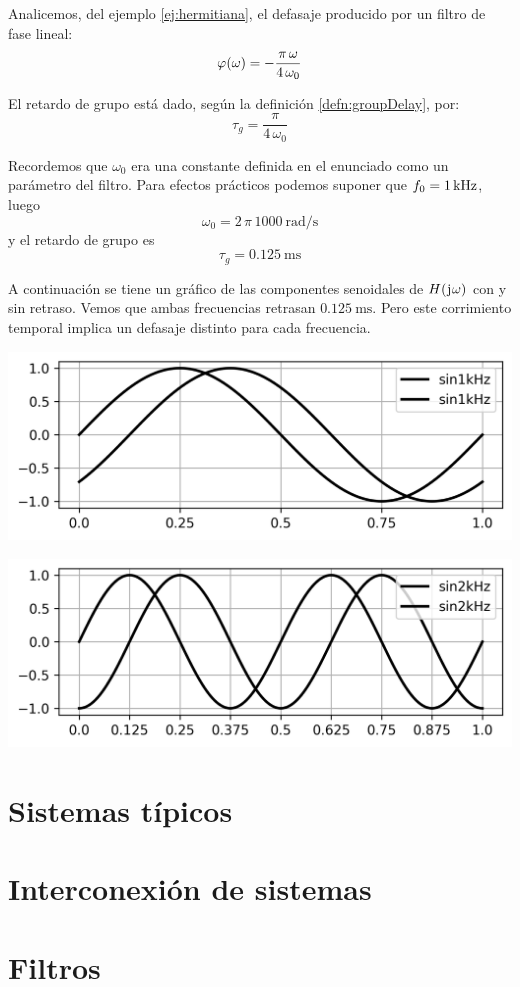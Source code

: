 \begin{mdframed}[style=ExampleFrame]
    \begin{example}
    \end{example}
    Analicemos, del ejemplo \ref{ej:hermitiana}, el defasaje producido por un filtro de fase lineal:
    \[
        \fx[\varphi]{\omega} = - \frac{\pi \, \omega}{4 \, \omega_0}
    \]

    El retardo de grupo está dado, según la definición \ref{defn:groupDelay}, por:
    \[
        \tau_g = \frac{\pi}{4 \, \omega_0}
    \]

    Recordemos que $\omega_0$ era una constante definida en el enunciado como un parámetro del filtro.
    Para efectos prácticos podemos suponer que $f_0 = \kHz$, luego
    \[
        \omega_0 = 2 \, \pi \, \SI{1000}{\radian\per\second}
    \]
    y el retardo de grupo es
    \[
        \tau_g = \SI{0.125}{\milli\second}
    \]

    A continuación se tiene un gráfico de las componentes senoidales de $\fx[H]{\iu \omega}$ con y sin retraso.
    Vemos que ambas frecuencias retrasan $\SI{0.125}{\milli\second}$.
    Pero este corrimiento temporal implica un defasaje distinto para cada frecuencia.

    \begin{center}
        \includegraphics[width=\linewidth]{./images/ej_fase_lineal_1.png}
    \end{center}

    \begin{center}
        \includegraphics[width=\linewidth]{./images/ej_fase_lineal_2.png}
    \end{center}
\end{mdframed}

\section{Sistemas típicos}

\section{Interconexión de sistemas}

\section{Filtros}